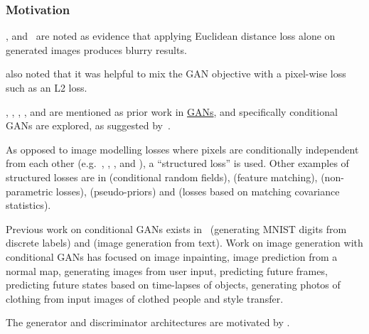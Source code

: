 \documentclass[a4paper, 12pt]{article}
\begin{document}
\subsubsection{Motivation}

\citet{DBLP:journals/corr/LarsenSW15}, \citet{DBLP:journals/corr/PathakKDDE16}
and~\citet{DBLP:journals/corr/ZhangIE16} are noted as evidence that applying
Euclidean distance loss alone on generated images produces blurry results.

\citet{DBLP:journals/corr/PathakKDDE16} also noted that it was helpful to mix
the GAN objective with a pixel-wise loss such as an L2 loss.

\citet{NIPS2014_5423}, \citet{DBLP:journals/corr/DentonCSF15},
\citet{DBLP:journals/corr/RadfordMC15},
\citet{DBLP:journals/corr/SalimansGZCRC16}, and
\citet{DBLP:journals/corr/ZhaoML16} are mentioned as prior work in
\hyperref[gan]{GANs}, and specifically conditional GANs are explored, as
suggested by~\citet{NIPS2014_5423}.

As opposed to image modelling losses where pixels are conditionally independent
from each other (e.g.~\citet{DBLP:journals/corr/ShelhamerLD16},
\citet{DBLP:journals/corr/XieT15}, \citet{IizukaSIGGRAPH2016},
\citet{DBLP:journals/corr/LarssonMS16} and \citet{DBLP:journals/corr/ZhangIE16}),
a ``structured loss'' is used. Other examples of structured losses are in
\citet{DBLP:journals/corr/ChenPKMY14} (conditional random fields),
\citet{DBLP:journals/corr/DosovitskiyB16} (feature matching),
\citet{DBLP:journals/corr/LiW16} (non-parametric losses),
\citet{DBLP:journals/corr/XieHT15} (pseudo-priors) and
\citet{DBLP:journals/corr/JohnsonAL16} (losses based on matching covariance
statistics).

Previous work on conditional GANs exists in~\citet{DBLP:journals/corr/MirzaO14}
(generating MNIST digits from discrete labels) and
\citet{DBLP:journals/corr/ReedAYLSL16} (image generation from text). Work on
image generation with conditional GANs has focused on image
inpainting\citet{DBLP:journals/corr/PathakKDDE16}, image prediction from a
normal map\citet{DBLP:journals/corr/WangG16}, generating images from user
input\citet{DBLP:journals/corr/WangG16}, predicting future
frames\citet{DBLP:journals/corr/MathieuCL15}, predicting future states based on
time-lapses of objects\citet{DBLP:journals/corr/ZhouB16b}, generating photos of
clothing from input images of clothed people\citet{DBLP:journals/corr/YooKPPK16}
and style transfer\citet{DBLP:journals/corr/LiW16b}.

The generator and discriminator architectures are motivated by
\citet{DBLP:journals/corr/RadfordMC15}.
\end{document}
